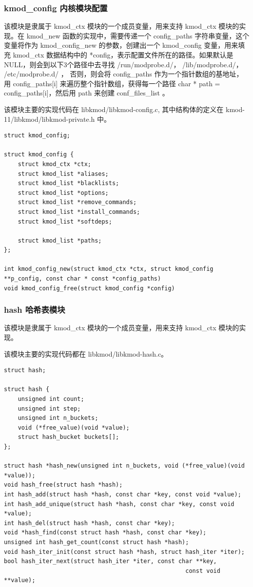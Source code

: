 \documentclass[11pt,a4paper]{article}
\begin{document}
\subsubsection{kmod\_config 内核模块配置}

该模块是隶属于 kmod\_ctx 模块的一个成员变量，用来支持 kmod\_ctx
模块的实现。在 kmod\_new 函数的实现中，需要传递一个 config\_paths
字符串变量，这个变量将作为 kmod\_config\_new 的参数，创建出一个
kmod\_config 变量，用来填充 kmod\_ctx 数据结构中的
*config，表示配置文件所在的路径。如果默认是NULL，则会到以下3个路径中去寻找
/run/modprobe.d/， /lib/modprobe.d/， /etc/modprobe.d/ ， 否则，则会将
config\_paths 作为一个指针数组的基地址，用 config\_paths{[}i{]}
来遍历整个指针数组，获得每一个路径 char * path =
config\_paths{[}i{]}，然后用 path 来创建 conf\_files\_list 。

该模块主要的实现代码在 libkmod/libkmod-config.c, 其中结构体的定义在
kmod-11/libkmod/libkmod-private.h 中。

{\begin{shaded}\begin{verbatim}
struct kmod_config;

struct kmod_config {
    struct kmod_ctx *ctx;
    struct kmod_list *aliases;
    struct kmod_list *blacklists;
    struct kmod_list *options;
    struct kmod_list *remove_commands;
    struct kmod_list *install_commands;
    struct kmod_list *softdeps;

    struct kmod_list *paths;
};

int kmod_config_new(struct kmod_ctx *ctx, struct kmod_config **p_config, const char * const *config_paths)
void kmod_config_free(struct kmod_config *config)
\end{verbatim}\end{shaded}}
\subsubsection{hash 哈希表模块}

该模块是隶属于 kmod\_ctx 模块的一个成员变量，用来支持 kmod\_ctx
模块的实现。

该模块主要的实现代码都在 libkmod/libkmod-hash.c。

{\begin{shaded}\begin{verbatim}
struct hash;

struct hash {
    unsigned int count;
    unsigned int step;
    unsigned int n_buckets;
    void (*free_value)(void *value);
    struct hash_bucket buckets[];
};

struct hash *hash_new(unsigned int n_buckets, void (*free_value)(void *value));
void hash_free(struct hash *hash);
int hash_add(struct hash *hash, const char *key, const void *value);
int hash_add_unique(struct hash *hash, const char *key, const void *value);
int hash_del(struct hash *hash, const char *key);
void *hash_find(const struct hash *hash, const char *key);
unsigned int hash_get_count(const struct hash *hash);
void hash_iter_init(const struct hash *hash, struct hash_iter *iter);
bool hash_iter_next(struct hash_iter *iter, const char **key,
                                                    const void **value);
\end{verbatim}\end{shaded}}
\end{document}
